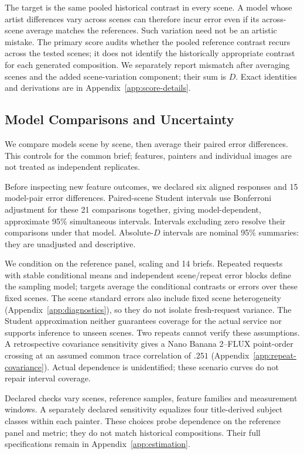 The target is the same pooled historical contrast in every scene. A model
whose artist differences vary across scenes can therefore incur error even
if its across-scene average matches the references. Such variation need not
be an artistic mistake. The primary score audits whether the pooled reference
contrast recurs across the tested scenes; it does not identify the historically
appropriate contrast for each generated composition. We separately report mismatch after averaging scenes
and the added scene-variation component; their sum is $D$. Exact identities
and derivations are in Appendix~\ref{app:score-details}.

\subsection{Model Comparisons and Uncertainty}
We compare models scene by scene, then average their paired error differences.
This controls for the common brief; features, painters and individual images
are not treated as independent replicates.

Before inspecting new feature outcomes, we declared six aligned responses and
15 model-pair error differences. Paired-scene Student intervals use Bonferroni
adjustment for these 21 comparisons together, giving model-dependent,
approximate 95\% simultaneous intervals. Intervals excluding zero resolve
their comparisons under that model.
Absolute-$D$ intervals are nominal 95\% summaries: they are unadjusted and descriptive.

We condition on the reference panel, scaling and 14 briefs. Repeated requests
with stable conditional means and independent scene/repeat error blocks define
the sampling model; targets average the conditional contrasts or errors over
these fixed scenes. The scene standard errors also include fixed scene
heterogeneity (Appendix~\ref{app:diagnostics}), so they do not isolate
fresh-request variance. The Student approximation neither guarantees coverage
for the actual service nor supports inference to unseen scenes. Two repeats
cannot verify these assumptions.
A retrospective covariance sensitivity gives a Nano Banana 2--FLUX point-order
crossing at an assumed common trace correlation of $.251$
(Appendix~\ref{app:repeat-covariance}). Actual dependence is unidentified;
these scenario curves do not repair interval coverage.

Declared checks vary scenes, reference samples, feature families and measurement
windows. A separately declared sensitivity equalizes four title-derived subject
classes within each painter. These choices probe dependence on the reference
panel and metric; they do not match historical compositions. Their full
specifications remain in Appendix~\ref{app:estimation}.

